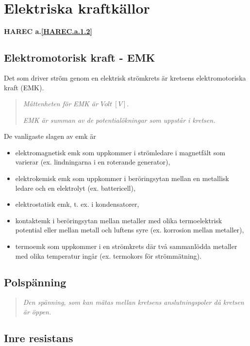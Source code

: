 \section{Elektriska kraftkällor}
\textbf{HAREC a.\ref{HAREC.a.1.2}\label{myHAREC.a.1.2}}

\subsection{Elektromotorisk kraft - EMK}

Det som driver ström genom en elektrisk strömkrets är kretsens elektromotoriska
kraft (EMK).

\begin{quote}
\emph{Måttenheten för EMK är $Volt\ [V]$.}

\emph{EMK är summan av de potentialökningar som uppstår i kretsen.}
\end{quote}

De vanligaste slagen av emk är
\begin{itemize}
\item elektromagnetisk emk som uppkommer i strömledare i magnetfält som
varierar (ex. lindningarna i en roterande generator),
\item elektrokemisk emk som uppkommer i beröringsytan mellan en metallisk
ledare och en elektrolyt (ex. battericell),
\item elektrostatisk emk, t. ex. i kondensatorer,
\item kontaktemk i beröringsytan mellan metaller med olika termoelektrisk
potential eller mellan metall och luftens syre (ex. korrosion mellan metaller),
\item termoemk som uppkommer i en strömkrets där två sammanlödda metaller med
olika temperatur ingår (ex. termokors för strömmätning).
\end{itemize}

\subsection{Polspänning}

\begin{quote}\emph{
Den spänning, som kan mätas mellan kretsens anslutningspoler då kretsen är öppen.
}\end{quote}

\subsection{Inre resistans}

